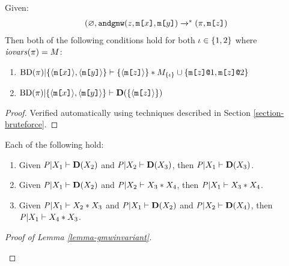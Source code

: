 \begin{lemma}
  \label{lemma-gmwtactic}
  Given:
  $$
  \begin{array}{c}
  (\varnothing,\andgmw(z,\mesg{x},\mesg{y}) \redxs %
  (\prog,\mesg{z})
  \end{array}
  $$
  Then both of the following conditions hold for both $\cid \in \{ 1,2 \}$ where $\iov(\prog) = M$:
  \begin{enumerate}
   \item $\condsep
      {\progtt(\prog)}
      {\{ \macgv{\mesg{x}},\macgv{\mesg{y}} \}}
      {\{ \macgv{\mesg{z}} \}}
      {M_{\{\cid\}} \cup \{ \elab{\mesg{z}}{1},\elab{\mesg{z}}{2} \}}$
    \item
      $\conddetx{\progtt(\prog)}{\{ \macgv{\mesg{x}},\macgv{\mesg{y}} \}}{\{ \macgv{\mesg{z}} \}}$
  \end{enumerate}
\end{lemma}

\begin{proof}
Verified automatically using techniques described in Section \ref{section-bruteforce}.  
\end{proof}

\begin{lemma}
  \label{lemma-conditioning}
  Each of the following hold:
  \begin{enumerate}
    \item Given $\condp{\pmf}{X_1}{\detx{X_2}}$ and
      $\condp{\pmf}{X_2}{\detx{X_3}}$, then $\condp{\pmf}{X_1}{\detx{X_3}}$.
    \item Given $\condp{\pmf}{X_1}{\detx{X_2}}$ and
      $\condsep{\pmf}{X_2}{X_3}{X_4}$, then $\condsep{\pmf}{X_1}{X_3}{X_4}$.
    \item Given $\condsep{\pmf}{X_1}{X_2}{X_3}$ and $\condp{\pmf}{X_1}{\detx{X_2}}$
      and $\condp{\pmf}{X_2}{\detx{X_4}}$, then $\condsep{\pmf}{X_1}{X_4}{X_3}$.
  \end{enumerate}
\end{lemma}

\begin{proof}[Proof of Lemma \ref{lemma-gmwinvariant}]
\begin{mathpar}
  
  
\end{mathpar}
\end{proof}

